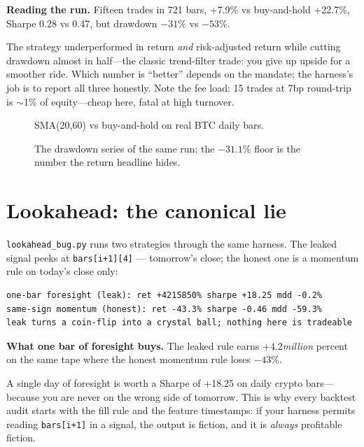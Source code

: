 \begin{example}\label{ex:sma}
\textbf{Reading the run.} Fifteen trades in 721 bars, +7.9\% vs buy-and-hold +22.7\%,
Sharpe 0.28 vs 0.47, but drawdown $-31$\% vs $-53$\%.
\begin{solution}
The strategy underperformed in return \emph{and} risk-adjusted return while cutting
drawdown almost in half---the classic trend-filter trade: you give up upside for a
smoother ride. Which number is ``better'' depends on the mandate; the harness's job is to
report all three honestly. Note the fee load: 15 trades at 7bp round-trip is $\sim$1\% of
equity---cheap here, fatal at high turnover.
\end{solution}
\end{example}

\begin{figure}[htbp]\centering

\caption{SMA(20,60) vs buy-and-hold on real BTC daily bars.}
\label{fig:eqcurve}
\end{figure}

\begin{figure}[htbp]\centering

\caption{The drawdown series of the same run; the $-31.1$\% floor is the number the
return headline hides.}
\label{fig:dd08}
\end{figure}

\section{Lookahead: the canonical lie}\label{sec:lookahead}

\texttt{lookahead\_bug.py} runs two strategies through the same harness. The
leaked signal peeks at \texttt{bars[i+1][4]} --- tomorrow's close; the honest one
is a momentum rule on today's close only:
\begin{lstlisting}[numbers=none]
one-bar foresight (leak): ret +4215850% sharpe +18.25 mdd -0.2%
same-sign momentum (honest): ret -43.3% sharpe -0.46 mdd -59.3%
leak turns a coin-flip into a crystal ball; nothing here is tradeable
\end{lstlisting}

\begin{example}\label{ex:leak}
\textbf{What one bar of foresight buys.} The leaked rule earns $+4.2$\emph{million} percent on the same tape
where the honest momentum rule loses $-43$\%.
\begin{solution}
A single day of foresight is worth a Sharpe of +18.25 on daily crypto bars---because you are
never on the wrong side of tomorrow. This is why every backtest audit starts with the fill
rule and the feature timestamps: if your harness permits reading \texttt{bars[i+1]} in a
signal, the output is fiction, and it is \emph{always} profitable fiction.
\end{solution}
\end{example}

